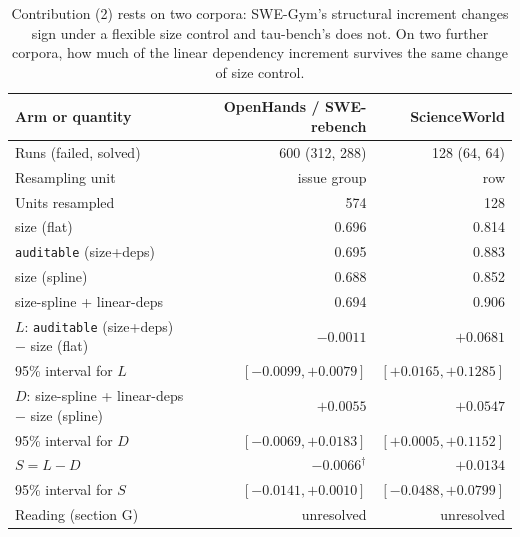 \begin{table}[t]
\centering
\scriptsize
\setlength{\tabcolsep}{4pt}
\caption{Contribution (2) rests on two corpora: SWE-Gym's structural increment changes sign under a flexible size control and tau-bench's does not. On two further corpora, how much of the linear dependency increment survives the same change of size control.}
\label{tab:post-generalization}
\begin{tabular}{@{}lrr@{}}
\toprule
Arm or quantity & OpenHands / SWE-rebench & ScienceWorld \\
\midrule
Runs (failed, solved) & 600 (312, 288) & 128 (64, 64) \\
Resampling unit & issue group & row \\
Units resampled & 574 & 128 \\
\midrule
size (flat) & 0.696 & 0.814 \\
\texttt{auditable} (size+deps) & 0.695 & 0.883 \\
size (spline) & 0.688 & 0.852 \\
size-spline + linear-deps & 0.694 & 0.906 \\
\midrule
$L$: \texttt{auditable} (size+deps) $-$ size (flat) & $-0.0011$ & $+0.0681$ \\
95\% interval for $L$ & $[-0.0099, +0.0079]$ & $[+0.0165, +0.1285]$ \\
$D$: size-spline + linear-deps $-$ size (spline) & $+0.0055$ & $+0.0547$ \\
95\% interval for $D$ & $[-0.0069, +0.0183]$ & $[+0.0005, +0.1152]$ \\
$S = L - D$ & $-0.0066^{\dagger}$ & $+0.0134$ \\
95\% interval for $S$ & $[-0.0141, +0.0010]$ & $[-0.0488, +0.0799]$ \\
\midrule
Reading (section G) & unresolved & unresolved \\
\bottomrule
\end{tabular}
\end{table}
